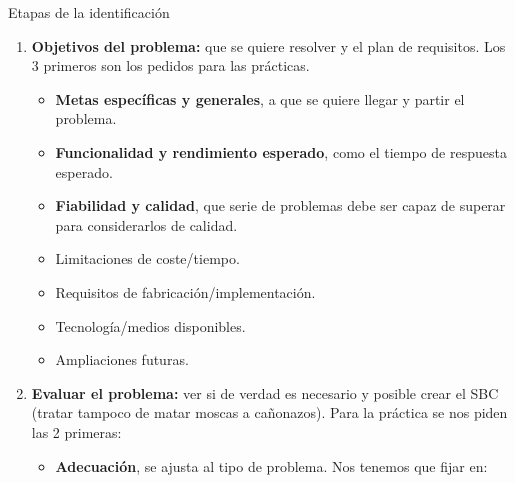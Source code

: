 \documentclass[12pt, twoside, openright]{report} %
\begin{document}
Etapas de la identificación
\begin{enumerate}
	\item \textbf{Objetivos del problema:} que se quiere resolver y el plan de requisitos. Los 3 primeros son los pedidos para las prácticas.
	      \begin{itemize}
		      \item \textbf{Metas específicas y generales}, a que se quiere llegar y partir el problema.
		      \item \textbf{Funcionalidad y rendimiento esperado}, como el tiempo de respuesta esperado.
		      \item \textbf{Fiabilidad y calidad}, que serie de problemas debe ser capaz de superar para considerarlos de calidad.
		      \item Limitaciones de coste/tiempo.
		      \item Requisitos de fabricación/implementación.
		      \item Tecnología/medios disponibles.
		      \item Ampliaciones futuras.
	      \end{itemize}
	      \pagebreak
	      
	\item \textbf{Evaluar el problema:} ver si de verdad es necesario y posible crear el SBC (tratar tampoco de matar moscas a cañonazos). Para la práctica se nos piden las 2 primeras:
	      \begin{itemize}
		      \item \textbf{Adecuación}, se ajusta al tipo de problema. Nos tenemos que fijar en:
		            

\end{itemize}
\end{enumerate}
\end{document}
